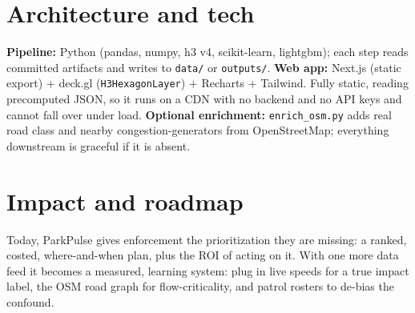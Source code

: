 \documentclass[11pt,a4paper]{article}
\begin{document}
\section{Architecture and tech}
\textbf{Pipeline:} Python (pandas, numpy, h3 v4, scikit-learn, lightgbm); each step reads committed artifacts and writes to \texttt{data/} or \texttt{outputs/}.
\textbf{Web app:} Next.js (static export) + deck.gl (\texttt{H3HexagonLayer}) + Recharts + Tailwind. Fully static, reading precomputed JSON, so it runs on a CDN with no backend and no API keys and cannot fall over under load.
\textbf{Optional enrichment:} \texttt{enrich\_osm.py} adds real road class and nearby congestion-generators from OpenStreetMap; everything downstream is graceful if it is absent.

\section{Impact and roadmap}
Today, ParkPulse gives enforcement the prioritization they are missing: a ranked, costed, where-and-when plan, plus the ROI of acting on it. With one more data feed it becomes a measured, learning system: plug in live speeds for a true impact label, the OSM road graph for flow-criticality, and patrol rosters to de-bias the confound.
\end{document}
